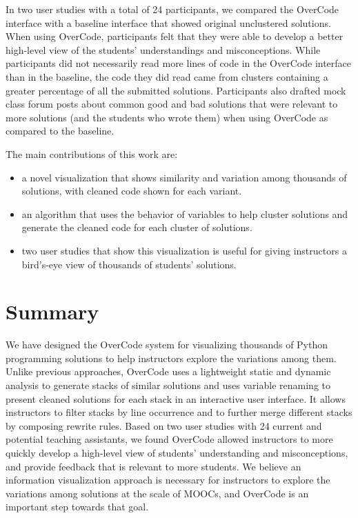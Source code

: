 \documentclass{sigchi}
\begin{document}
In two user studies with a total of 24 participants, we compared the OverCode interface with a baseline interface that showed original unclustered solutions. When using OverCode, participants felt that they were able to develop a better high-level view of the students' understandings and misconceptions. While participants did not necessarily read more lines of code in the OverCode interface than in the baseline, the code they did read came from clusters containing a greater percentage of all the submitted solutions. Participants also drafted mock class forum posts about common good and bad solutions that were relevant to more solutions (and the students who wrote them) when using OverCode as compared to the baseline. 

The main contributions of this work are:
\begin{itemize}
\item a novel visualization that shows similarity and variation among thousands of solutions, with cleaned code shown for each variant. 
\item an algorithm that uses the behavior of variables to help cluster solutions and generate the cleaned code for each cluster of solutions.
\item two user studies that show this visualization is useful for giving instructors a bird's-eye view of thousands of students' solutions.
\end{itemize}

\section{Summary}
We have designed the OverCode system for visualizing thousands of Python programming solutions to help instructors explore the variations among them. Unlike previous approaches, OverCode uses a lightweight static and dynamic analysis to generate stacks of similar solutions and uses variable renaming to present cleaned solutions for each stack in an interactive user interface. It allows instructors to filter stacks by line occurrence and to further merge different stacks by composing rewrite rules. Based on two user studies with 24 current and potential teaching assistants, we found OverCode allowed instructors to more quickly develop a high-level view of students' understanding and misconceptions, and provide feedback that is relevant to more students. We believe an information visualization approach is necessary for instructors to explore the variations among solutions at the scale of MOOCs, and OverCode is an important step towards that goal. 	
\end{document}
